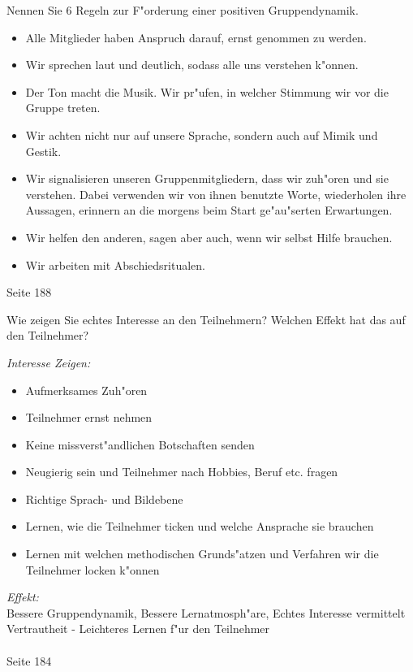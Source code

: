\begin{question}{3}
Nennen Sie 6 Regeln zur F"orderung einer positiven Gruppendynamik.
\end{question}
\begin{solution}
\begin{itemize}
\item Alle Mitglieder haben Anspruch darauf, ernst genommen zu werden.
\item Wir sprechen laut und deutlich, sodass alle uns verstehen k"onnen.
\item Der Ton macht die Musik. Wir pr"ufen, in welcher Stimmung wir vor die Gruppe treten.
\item Wir achten nicht nur auf unsere Sprache, sondern auch auf Mimik und Gestik.
\item Wir signalisieren unseren Gruppenmitgliedern, dass wir zuh"oren und sie verstehen. Dabei verwenden wir von ihnen benutzte Worte, wiederholen ihre Aussagen, erinnern an die morgens beim Start ge"au"serten Erwartungen.
\item Wir helfen den anderen, sagen aber auch, wenn wir selbst Hilfe brauchen.
\item Wir arbeiten mit Abschiedsritualen.
\end{itemize}
 Seite 188
\end{solution}

\begin{question}{4}
Wie zeigen Sie echtes Interesse an den Teilnehmern? Welchen Effekt hat das auf den Teilnehmer?
\end{question}
\begin{solution}
\emph{Interesse Zeigen:}
\begin{itemize}
\item Aufmerksames Zuh"oren
\item Teilnehmer ernst nehmen
\item Keine missverst"andlichen Botschaften senden
\item Neugierig sein und Teilnehmer nach Hobbies, Beruf etc. fragen
\item Richtige Sprach- und Bildebene
\item Lernen, wie die Teilnehmer ticken und welche Ansprache sie brauchen
\item Lernen mit welchen methodischen Grunds"atzen und Verfahren wir die Teilnehmer locken k"onnen
\end{itemize}
\emph{Effekt:}\\
Bessere Gruppendynamik, Bessere Lernatmosph"are, Echtes Interesse vermittelt Vertrautheit - Leichteres Lernen f"ur den Teilnehmer\\\\
 Seite 184
\end{solution}